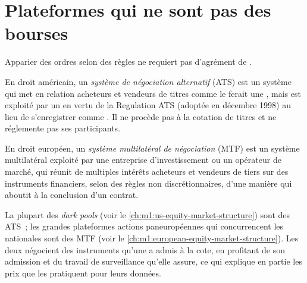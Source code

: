 \section{Plateformes qui ne sont pas des bourses}

Apparier des ordres selon des règles ne requiert pas d'agrément de .

\begin{definition}\label{def:m1:exchanges-brokers-venues:ats}
En droit américain, un \emph{système de négociation alternatif}
(ATS) est un système qui met en relation acheteurs et vendeurs de titres comme le ferait une , mais
est exploité par un  en vertu de la Regulation ATS
(adoptée en décembre 1998) au lieu de s'enregistrer comme . Il ne
procède pas à la cotation de titres et ne réglemente pas ses participants.
\end{definition}

\begin{definition}\label{def:m1:exchanges-brokers-venues:mtf}
En droit européen, un \emph{système multilatéral de négociation}
(MTF) est un système multilatéral exploité par une entreprise d'investissement ou un opérateur de marché,
qui réunit de multiples intérêts acheteurs et vendeurs de tiers
sur des instruments financiers, selon des règles non discrétionnaires, d'une manière
qui aboutit à la conclusion d'un contrat.
\end{definition}

La plupart des \emph{dark pools} (voir le \cref{ch:m1:us-equity-market-structure}) sont des ATS~;
les grandes plateformes actions paneuropéennes qui concurrencent les  nationales
sont des MTF (voir le \cref{ch:m1:european-equity-market-structure}). Les deux négocient
des instruments qu'une  a admis à la cote, en profitant de son admission
et du travail de surveillance qu'elle assure, ce qui explique en partie les prix que les 
pratiquent pour leurs données.

